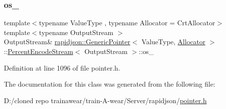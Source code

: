 \subsubsection{\texorpdfstring{os\_}{os\_}}
{\footnotesize\ttfamily template$<$typename Value\+Type , typename Allocator  = Crt\+Allocator$>$ \\
template$<$typename Output\+Stream $>$ \\
Output\+Stream\& \mbox{\hyperlink{classrapidjson_1_1_generic_pointer}{rapidjson\+::\+Generic\+Pointer}}$<$ Value\+Type, \mbox{\hyperlink{classrapidjson_1_1_allocator}{Allocator}} $>$\+::\mbox{\hyperlink{classrapidjson_1_1_generic_pointer_1_1_percent_encode_stream}{Percent\+Encode\+Stream}}$<$ Output\+Stream $>$\+::os\+\_\+\hspace{0.3cm}{\ttfamily [private]}}



Definition at line 1096 of file pointer.\+h.



The documentation for this class was generated from the following file\+:\begin{DoxyCompactItemize}
\item 
D\+:/cloned repo trainawear/train-\/\+A-\/wear/\+Server/rapidjson/\mbox{\hyperlink{pointer_8h}{pointer.\+h}}\end{DoxyCompactItemize}
